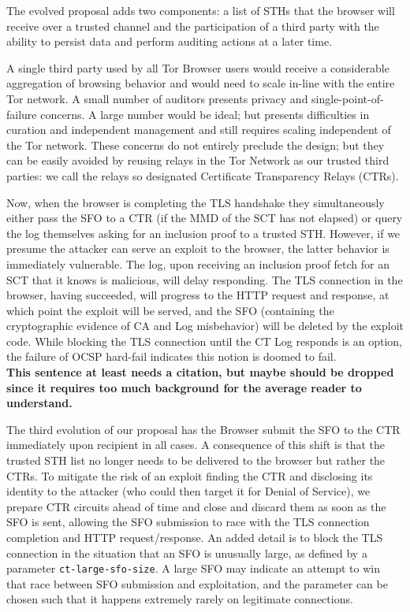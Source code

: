 The evolved proposal adds two components: a list of STHs that the browser will receive over a trusted channel and the participation of a third party with the ability to persist data and perform auditing actions at a later time.

A single third party used by all Tor Browser users would receive a considerable aggregation of browsing behavior and would need to scale in-line with the entire Tor network. A small number of auditors presents privacy and single-point-of-failure concerns. A large number would be ideal; but presents difficulties in curation and independent management and still requires scaling independent of the Tor network. These concerns do not entirely preclude the design; but they can be easily avoided by reusing relays in the Tor Network as our trusted third parties: we call the relays so designated Certificate Transparency Relays (CTRs).

Now, when the browser is completing the TLS handshake they simultaneously either pass the SFO to a CTR (if the MMD of the SCT has not elapsed) or query the log themselves asking for an inclusion proof to a trusted STH\@.  However, if we presume the attacker can serve an exploit to the browser, the latter behavior is immediately vulnerable. The log, upon receiving an inclusion proof fetch for an SCT that it knows is malicious, will delay responding. The TLS connection in the browser, having succeeded, will progress to the HTTP request and response, at which point the exploit will be served, and the SFO (containing the cryptographic evidence of CA and Log misbehavior) will be deleted by the exploit code. While blocking the TLS connection until the CT Log responds is an option, the failure of OCSP hard-fail indicates this notion is doomed to fail.\\ %
{\bf \color{red}This sentence at least needs a citation, but maybe should be dropped since it requires too much background for the average reader to understand.}

The third evolution of our proposal has the Browser submit the SFO to the CTR immediately upon recipient in all cases. A consequence of this shift is that the trusted STH list no longer needs to be delivered to the browser but rather the CTRs. To mitigate the risk of an exploit finding the CTR and disclosing its identity to the attacker (who could then target it for Denial of Service), we prepare CTR circuits ahead of time and close and discard them as soon as the SFO is sent, allowing the SFO submission to race with the TLS connection completion and HTTP request/response.  An added detail is to block the TLS connection in the situation that an SFO is unusually large, as defined by a parameter \texttt{ct-large-sfo-size}. A large SFO may indicate an attempt to win that race between SFO submission and exploitation, and the parameter can be chosen such that it happens extremely rarely on legitimate connections.

